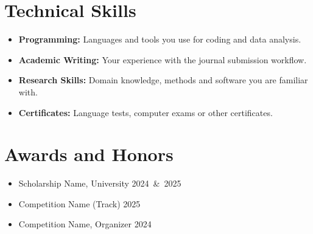 \documentclass[11pt,a4paper]{article}
\newenvironment{cvitems}
  {\begin{itemize}[leftmargin=1.5em,itemsep=1pt,topsep=1pt,parsep=0pt,partopsep=0pt,label=\textbullet]}
  {\end{itemize}}
\begin{document}
\section*{Technical Skills}

\begin{cvitems}
  \item \textbf{Programming:} Languages and tools you use for coding and data analysis.
  \item \textbf{Academic Writing:} Your experience with the journal submission workflow.
  \item \textbf{Research Skills:} Domain knowledge, methods and software you are familiar with.
  \item \textbf{Certificates:} Language tests, computer exams or other certificates.
\end{cvitems}

\section*{Awards and Honors}

\begin{cvitems}
  \item Scholarship Name, University \hfill \mbox{2024 \& 2025}
  \item Competition Name (Track) \hfill \mbox{2025}
  \item Competition Name, Organizer \hfill \mbox{2024}
\end{cvitems}
\end{document}
